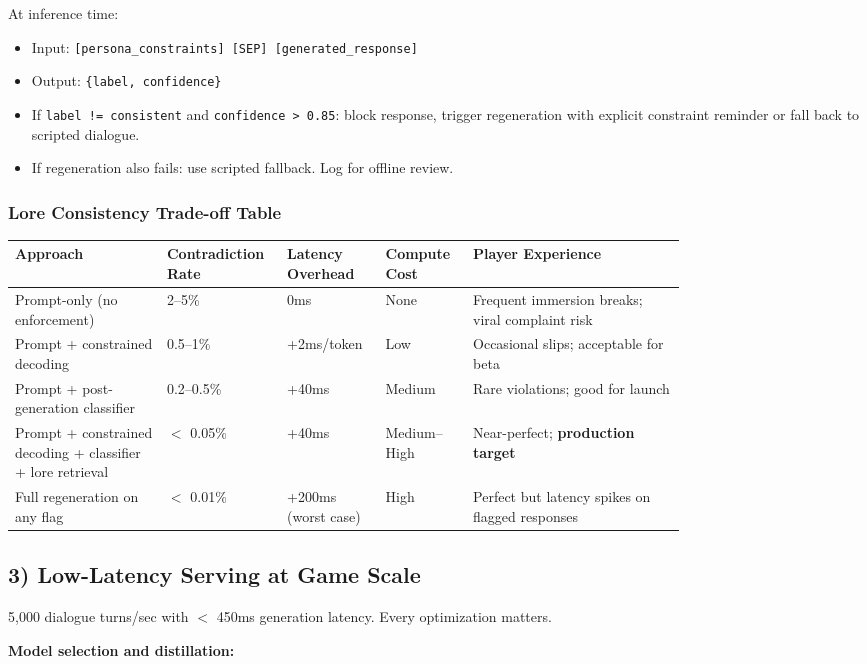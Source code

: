 At inference time:
\begin{itemize}
  \item Input: \texttt{[persona\_constraints] [SEP] [generated\_response]}
  \item Output: \texttt{\{label, confidence\}}
  \item If \texttt{label != consistent} and \texttt{confidence > 0.85}: block response, trigger regeneration with explicit constraint reminder or fall back to scripted dialogue.
  \item If regeneration also fails: use scripted fallback. Log for offline review.
\end{itemize}

\subsubsection*{Lore Consistency Trade-off Table}

\begin{tabular}{|p{0.2\linewidth}|p{0.1\linewidth}|p{0.1\linewidth}|p{0.1\linewidth}|p{0.28\linewidth}|}
\hline
\textbf{Approach} & \textbf{Contradiction Rate} & \textbf{Latency Overhead} & \textbf{Compute Cost} & \textbf{Player Experience} \\
\hline
Prompt-only (no enforcement) & 2--5\% & 0ms & None & Frequent immersion breaks; viral complaint risk \\
\hline
Prompt + constrained decoding & 0.5--1\% & +2ms/token & Low & Occasional slips; acceptable for beta \\
\hline
Prompt + post-generation classifier & 0.2--0.5\% & +40ms & Medium & Rare violations; good for launch \\
\hline
Prompt + constrained decoding + classifier + lore retrieval & $<$ 0.05\% & +40ms & Medium--High & Near-perfect; \textbf{production target} \\
\hline
Full regeneration on any flag & $<$ 0.01\% & +200ms (worst case) & High & Perfect but latency spikes on flagged responses \\
\hline
\end{tabular}

\subsection*{3) Low-Latency Serving at Game Scale}

5,000 dialogue turns/sec with $<$ 450ms generation latency. Every optimization matters.

\textbf{Model selection and distillation:}

